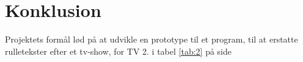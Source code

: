 \section{Konklusion}
Projektets formål lød på at udvikle en prototype til et program, til at erstatte rulletekster efter et tv-show, for TV 2. i tabel \ref{tab:2} på side \pageref{tab}